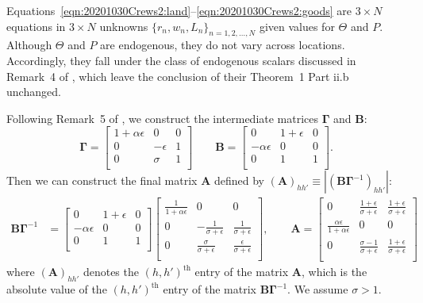 \documentclass[11pt]{article}
\theoremstyle{definition}
\begin{document}
Equations~\eqref{eqn:20201030Crews2:land}--\eqref{eqn:20201030Crews2:goods}
are $3 \times N$ equations in $3 \times N$ unknowns $\{r_n, w_n, L_n\}_{n=1,2,\ldots,N}$
given values for $\Theta$ and $P$.
Although $\Theta$ and $P$ are endogenous,
they do not vary across locations.
Accordingly, they fall under the class of endogenous scalars
discussed in Remark~4 of ,
which leave the conclusion of their Theorem~1 Part ii.b unchanged.
 
Following Remark~5 of ,
we construct the intermediate matrices $\mathbf{\Gamma}$ and $\mathbf{B}$:
\begin{equation*}
    \mathbf{\Gamma} = \begin{bmatrix}
        1 + \alpha \epsilon & 0 & 0 \\
        0 & -\epsilon & 1 \\
        0 & \sigma & 1 \\
    \end{bmatrix}
    \qquad
    \mathbf{B} = \begin{bmatrix}
        0 & 1+\epsilon & 0 \\
        -\alpha \epsilon & 0 & 0 \\
        0 & 1 & 1 \\
    \end{bmatrix}.
\end{equation*}
Then we can construct the final matrix $\mathbf{A}$ defined by $(\mathbf{A})_{hh'} \equiv \left|\left(\mathbf{B} \mathbf{\Gamma}^{-1}\right)_{hh'}\right|$:
\begin{align*}
    \mathbf{B} \mathbf{\Gamma}^{-1}
    &=
    \begin{bmatrix}
        0 & 1+\epsilon & 0 \\
        -\alpha \epsilon & 0 & 0 \\
        0 & 1 & 1 \\
    \end{bmatrix}
    \begin{bmatrix}
        \frac{1}{1 + \alpha \epsilon} & 0 & 0 \\
        0 & -\frac{1}{\sigma + \epsilon} & \frac{1}{\sigma + \epsilon} \\
        0 & \frac{\sigma}{\sigma + \epsilon} & \frac{\epsilon}{\sigma + \epsilon} \\
    \end{bmatrix}
    , \qquad
    \mathbf{A} =
    \begin{bmatrix}
        0 & \frac{1+\epsilon}{\sigma + \epsilon} & \frac{1+\epsilon}{\sigma + \epsilon} \\
        \frac{\alpha \epsilon}{1 + \alpha \epsilon} & 0 & 0 \\
        0 & \frac{\sigma-1}{\sigma + \epsilon} & \frac{1+\epsilon}{\sigma + \epsilon} \\
    \end{bmatrix}
\end{align*}
where $(\mathbf{A})_{hh'}$ denotes the $(h,h')^{\text{th}}$ entry of the matrix $\mathbf{A}$,
which is the absolute value of the $(h,h')^{\text{th}}$ entry of the matrix $\mathbf{B} \mathbf{\Gamma}^{-1}$.
We assume $\sigma>1$.
\end{document}
